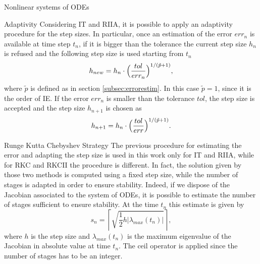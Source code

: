 \documentclass{article}
\begin{document}
\begin{section}{Nonlinear systems of ODEs}
\begin{subsection}{Adaptivity}\label{sect:adapt}
Considering IT and RIIA, it is possible to apply an adaptivity procedure for the step sizes. In particular, once an estimation of the error $err_n$ is available at time step $t_n$, if it is bigger than the tolerance the current step size $h_n$ is refused and the following step size is used starting from $t_n$
\begin{equation*}
	h_{new} = h_n \cdot \Big{(}\frac{tol}{err_n}\Big{)}^{1/(\tilde{p}+1)},
\end{equation*}
where $\tilde{p}$ is defined as in section \ref{subsec:errorestim}. In this case $\tilde{p} = 1$, since it is the order of IE. If the error $err_n$ is smaller than the tolerance $tol$, the step size is accepted and the step size $h_{n+1}$ is chosen as
\begin{equation*}
	h_{n+1} = h_n \cdot \Big{(}\frac{tol}{err}\Big{)}^{1/(\tilde{p}+1)}.
\end{equation*}
\end{subsection}

\begin{subsection}{Runge Kutta Chebyshev Strategy}\label{subsec:RKCstrat}
The previous procedure for estimating the error and adapting the step size is used in this work only for IT and RIIA, while for RKC and RKCII the procedure is different. In fact, the solution given by those two methods is computed using a fixed step size, while the number of stages is adapted in order to ensure stability. Indeed, if we dispose of the Jacobian associated to the system of ODEs, it is possible to estimate the number of stages sufficient to ensure stability. At the time $t_n$ this estimate is given by
\begin{equation*}
	s_n = \left \lceil{\sqrt{ \frac{1}{2}h|\lambda_{max}(t_n)|}}\right \rceil,
\end{equation*}
where $h$ is the step size and $\lambda_{max}(t_n)$ is the maximum eigenvalue of the Jacobian in absolute value at time $t_n$. The ceil operator is applied since the number of stages has to be an integer.
\end{subsection}


\end{section}
\end{document}
